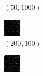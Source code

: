\documentclass[a4paper, landscape]{article}
\begin{document}
\begin{figure}[H]
\begin{subfigure}{0.09\linewidth}
        \caption*{$(50, 1000)$}
    \end{subfigure}
    \begin{subfigure}{0.09\linewidth}
        \centering
        \includegraphics[width=\linewidth]{omp/k = 200, m = 100.png}
        \caption*{$(200, 100)$}
    \end{subfigure}
    \begin{subfigure}{0.09\linewidth}
        \centering
        \includegraphics[width=\linewidth]{omp/k = 200, m = 200.png}

\end{subfigure}
\end{figure}
\end{document}
